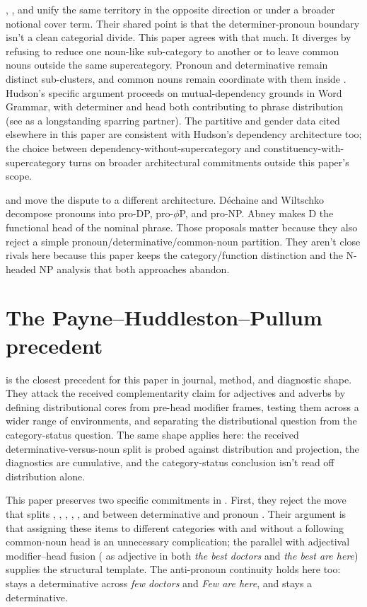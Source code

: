 \documentclass[12pt]{article}
\begin{document}
\textcite{postal1966}, \textcite{hudson2004determiners}, and \textcite{anderson1997notional} unify the same territory in the opposite direction or under a broader notional cover term. Their shared point is that the determiner-pronoun boundary isn't a clean categorial divide. This paper agrees with that much. It diverges by refusing to reduce one noun-like sub-category to another or to leave common nouns outside the same supercategory. Pronoun and determinative remain distinct sub-clusters, and common nouns remain coordinate with them inside . Hudson's specific argument proceeds on mutual-dependency grounds in Word Grammar, with determiner and head both contributing to phrase distribution (see \textcite{vanlangendonck1994} as a longstanding sparring partner). The partitive and gender data cited elsewhere in this paper are consistent with Hudson's dependency architecture too; the choice between dependency-without-supercategory and constituency-with-supercategory turns on broader architectural commitments outside this paper's scope.

\textcite{dechainewiltschko2002} and \textcite{abney1987} move the dispute to a different architecture. Déchaine and Wiltschko decompose pronouns into pro-DP, pro-$\phi$P, and pro-NP. Abney makes D the functional head of the nominal phrase. Those proposals matter because they also reject a simple pronoun/determinative/common-noun partition. They aren't close rivals here because this paper keeps the category/function distinction and the N-headed NP analysis that both approaches abandon.

\section{The Payne--Huddleston--Pullum precedent}\label{sec:php-precedent}

\textcite{payne2010} is the closest precedent for this paper in journal, method, and diagnostic shape. They attack the received complementarity claim for adjectives and adverbs by defining distributional cores from pre-head modifier frames, testing them across a wider range of environments, and separating the distributional question from the category-status question. The same shape applies here: the received determinative-versus-noun split is probed against distribution and projection, the diagnostics are cumulative, and the category-status conclusion isn't read off distribution alone.

This paper preserves two specific commitments in \textcite{payne2010}. First, they reject the move that splits , , , , , and  between determinative and pronoun \citep[13--14]{payne2010}. Their argument is that assigning these items to different categories with and without a following common-noun head is an unnecessary complication; the parallel with adjectival modifier--head fusion ( as adjective in both \textit{the best doctors} and \textit{the best are here}) supplies the structural template. The anti-pronoun continuity holds here too:  stays a determinative across \textit{few doctors} and \textit{Few are here}, and  stays a determinative.
\end{document}
